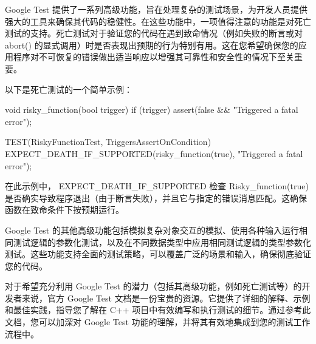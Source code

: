 Google Test 提供了一系列高级功能，旨在处理复杂的测试场景，为开发人员提供强大的工具来确保其代码的稳健性。在这些功能中，一项值得注意的功能是对死亡测试的支持。死亡测试对于验证您的代码在遇到致命情况（例如失败的断言或对 abort() 的显式调用）时是否表现出预期的行为特别有用。这在您希望确保您的应用程序对不可恢复的错误做出适当响应以增强其可靠性和安全性的情况下至关重要。

以下是死亡测试的一个简单示例：

\begin{cpp}
void risky_function(bool trigger) {
    if (trigger) {
        assert(false && "Triggered a fatal error");
    }
}

TEST(RiskyFunctionTest, TriggersAssertOnCondition) {
    EXPECT_DEATH_IF_SUPPORTED(risky_function(true), "Triggered a fatal error");
}
\end{cpp}

在此示例中， EXPECT\_DEATH\_IF\_SUPPORTED 检查 Risky\_function(true) 是否确实导致程序退出（由于断言失败），并且它与指定的错误消息匹配。这确保函数在致命条件下按预期运行。

Google Test 的其他高级功能包括模拟复杂对象交互的模拟、使用各种输入运行相同测试逻辑的参数化测试，以及在不同数据类型中应用相同测试逻辑的类型参数化测试。这些功能支持全面的测试策略，可以覆盖广泛的场景和输入，确保彻底验证您的代码。

对于希望充分利用 Google Test 的潜力（包括其高级功能，例如死亡测试等）的开发者来说，官方 Google Test 文档是一份宝贵的资源。它提供了详细的解释、示例和最佳实践，指导您了解在 C++ 项目中有效编写和执行测试的细节。通过参考此文档，您可以加深对 Google Test 功能的理解，并将其有效地集成到您的测试工作流程中。
